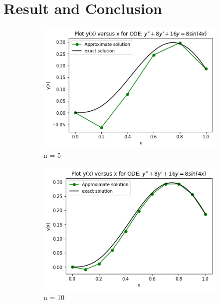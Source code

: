 \documentclass[a4paper,11.5 pt]{article}
\begin{document}
\section{Result and Conclusion}
\begin{figure}[htb] \label{result}
    \centering %
\begin{subfigure}{0.25\textwidth}
  \includegraphics[width=\linewidth]{diagram/n=5.png}
  \caption{n = 5}
  \label{fig:1}
\end{subfigure}\hfil %
\begin{subfigure}{0.25\textwidth}
  \includegraphics[width=\linewidth]{diagram/n = 10.png}
  \caption{n = 10}
  \label{fig:2}
\end{subfigure}\hfil %
\begin{subfigure}{0.25\textwidth}

\end{subfigure}
\end{figure}
\end{document}
